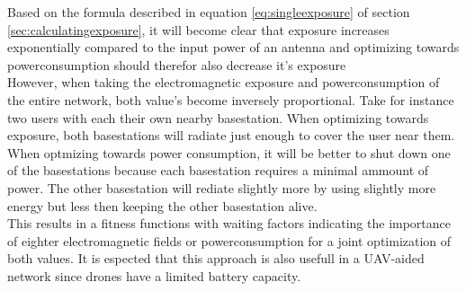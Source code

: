 Based on the formula described in equation \ref{eq:singleexposure} of section \ref{sec:calculatingexposure}, it will become clear that exposure increases exponentially compared to the input power
of an antenna and optimizing towards powerconsumption should therefor also decrease it's exposure\\

However, when taking the electromagnetic exposure and powerconsumption of the entire network, both value's become inversely proportional. Take for instance two users with each their own nearby basestation.
When optimizing towards exposure, both basestations will radiate just enough to cover the user near them. When optmizing towards power consumption, it will be better to shut down one of the basestations because
each basestation requires a minimal ammount of power. The other basestation will rediate slightly more by using slightly more energy but less then keeping the other basestation alive. \\

This results in a fitness functions with waiting factors indicating the importance of eighter electromagnetic fields or powerconsumption for a joint optimization of both values.
It is espected that this approach is also usefull in a UAV-aided network since drones have a limited battery capacity. \\




